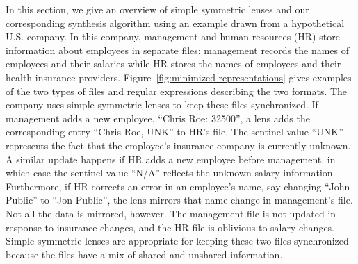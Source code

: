 \documentclass[acmsmall,screen,anonymous]{acmart}
\begin{document}
In this section, we give an overview of simple symmetric lenses and
our corresponding synthesis algorithm using an example drawn from a
hypothetical U.S. company.  In this company, management and
human resources (HR) store information about employees in separate files:
management records the names of employees and their salaries while
HR stores the names of employees and their health
insurance providers.  Figure~\ref{fig:minimized-representations} gives
examples of the two types of files and regular expressions describing
the two formats.
The company uses simple symmetric lenses to keep these files synchronized.
If management adds a new employee, ``Chris Roe: 32500'',  a lens adds 
the corresponding entry ``Chris Roe, UNK'' to HR's file.  The
sentinel value ``UNK'' represents the fact that the employee's
insurance company is currently unknown.  A similar update happens if
HR adds a new employee before management, in which case the sentinel
value ``N/A'' reflects the unknown salary information 
Furthermore, if HR
corrects an error in an employee's name, say changing ``John Public''
to ``Jon Public'', the lens mirrors that name change in management's
file. Not all the data is mirrored, however. The management file 
is not updated in response to insurance changes, and the HR file
is oblivious to salary changes.  Simple symmetric lenses are
appropriate for keeping these two files synchronized because the files have
a mix of shared and unshared information.

%
\end{document}

